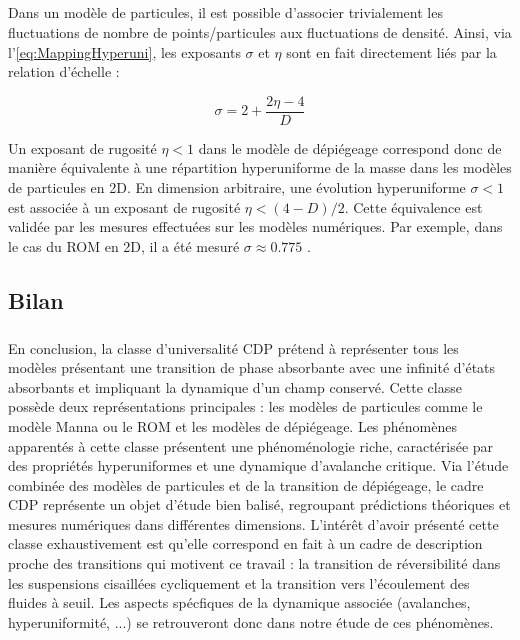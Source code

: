 \subparagraph{}Dans un modèle de particules, il est possible d'associer trivialement les fluctuations de nombre de points/particules aux fluctuations de densité. Ainsi, via l'\autoref{eq:MappingHyperuni}, les exposants $\sigma$ et $\eta$ sont en fait directement liés par la relation d'échelle :

\begin{equation}
	\sigma = 2 + \frac{2\eta - 4}{D}
	\label{eq:rel_eta_sigma}
\end{equation}

\noindent Un exposant de rugosité $\eta < 1$ dans le modèle de dépiégeage correspond donc de manière équivalente à une répartition hyperuniforme de la masse dans les modèles de particules en 2D. En dimension arbitraire, une évolution hyperuniforme $\sigma < 1$ est associée à un exposant de rugosité $\eta < (4-D)/2$. Cette équivalence est validée par les mesures effectuées sur les modèles numériques. Par exemple, dans le cas du ROM en 2D, il a été mesuré $\sigma \approx 0.775$ \cite{tjhung_hyperuniform_2015, hexner_hyperuniformity_2015, weijs_emergent_2015}.

\subsection{Bilan}

\subparagraph{}En conclusion, la classe d'universalité CDP prétend à représenter tous les modèles présentant une transition de phase absorbante avec une infinité d'états absorbants et impliquant la dynamique d'un champ conservé. Cette classe possède deux représentations principales : les modèles de particules comme le modèle Manna ou le ROM et les modèles de dépiégeage. Les phénomènes apparentés à cette classe présentent une phénoménologie riche, caractérisée par des propriétés hyperuniformes et une dynamique d'avalanche critique. Via l'étude combinée des modèles de particules et de la transition de dépiégeage, le cadre CDP représente un objet d'étude bien balisé, regroupant prédictions théoriques et mesures numériques dans différentes dimensions. L'intérêt d'avoir présenté cette classe exhaustivement est qu'elle correspond en fait à un cadre de description proche des transitions qui motivent ce travail : la transition de réversibilité dans les suspensions cisaillées cycliquement et la transition vers l'écoulement des fluides à seuil. Les aspects spécfiques de la dynamique associée (avalanches, hyperuniformité, ...) se retrouveront donc dans notre étude de ces phénomènes.


